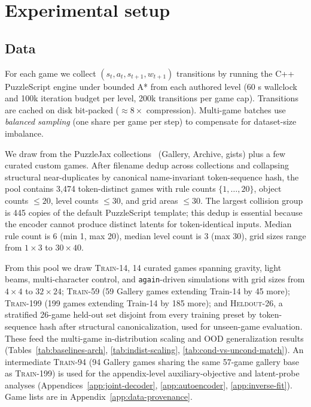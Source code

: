 \section{Experimental setup}
\label{sec:experiments}

\subsection{Data}

For each game we collect $(s_t, a_t, s_{t+1}, w_{t+1})$ transitions
by running the C++ PuzzleScript engine under bounded A* from each
authored level (60 s wallclock and 100k iteration budget per level,
200k transitions per game cap). Transitions are cached on disk
bit-packed ($\approx 8\times$ compression). Multi-game batches use
\emph{balanced sampling} (one share per game per step) to compensate
for dataset-size imbalance.

We draw from the PuzzleJax collections~\cite{earle2025puzzlejax}
(Gallery, Archive, gists) plus a few curated custom games. After
filename dedup across collections and collapsing structural
near-duplicates by canonical name-invariant token-sequence hash, the
pool contains 3{,}474 token-distinct games with rule counts
$\{1,\ldots,20\}$, object counts $\le 20$, level counts $\le 30$, and
grid areas $\le 30$. The largest collision group is 445 copies of
the default PuzzleScript template; this dedup is essential because
the encoder cannot produce distinct latents for token-identical inputs.
Median rule count is 6 (min 1, max 20), median level count is 3
(max 30), grid sizes range from $1{\times}3$ to $30{\times}40$.

From this pool we draw \textsc{Train-14}, 14 curated games spanning
gravity, light beams, multi-character control, and
\texttt{again}-driven simulations with grid sizes from $4{\times}4$ to
$32{\times}24$; \textsc{Train-59} (59 Gallery games extending Train-14
by 45 more); \textsc{Train-199} (199 games extending Train-14 by 185
more); and \textsc{Heldout-26}, a stratified 26-game held-out set
disjoint from every training preset by token-sequence hash after
structural canonicalization, used for unseen-game evaluation. These
feed the multi-game in-distribution scaling and OOD generalization
results (Tables~\ref{tab:baselines-arch}, \ref{tab:indist-scaling},
\ref{tab:cond-vs-uncond-match}). An intermediate \textsc{Train-94}
(94 Gallery games sharing the same 57-game gallery base as
\textsc{Train-199}) is used for the appendix-level auxiliary-objective
and latent-probe analyses (Appendices~\ref{app:joint-decoder},
\ref{app:autoencoder}, \ref{app:inverse-fit}). Game lists are in
Appendix~\ref{app:data-provenance}.

